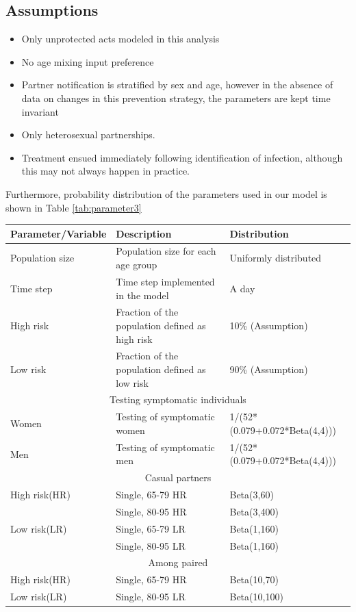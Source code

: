 \documentclass{article}
\begin{document}
\begin{normalsize}
\subsection{Assumptions}
\begin{itemize}
	\item Only unprotected acts modeled in this analysis
	\item No age mixing input preference
	\item Partner notification is stratified by sex and age, however in the absence of data on changes in this prevention strategy, the parameters are kept time invariant
	\item Only heterosexual partnerships.
	\item Treatment ensued immediately following identification of infection, although this may not always happen in practice.
\end{itemize}
Furthermore, probability distribution of the parameters used in our model is shown in Table \ref{tab:parameter3}\\
	\begin{table}[H]
	\centering
	\begin{tabular}{ |p{5cm}|p{7cm}|p{5cm}| } 
		\hline
		Parameter/Variable & Description & Distribution  \\ 
		\hline
		Population size & Population size for each age group & Uniformly distributed\\
		Time step &	Time step implemented in the model & 	A day \\
		High risk & Fraction of the population defined as high risk	& 10\% (Assumption) \\
		Low risk & Fraction of the population defined as low risk & 90\% (Assumption)\\
		\hline
		\multicolumn{3}{|c|}{Testing symptomatic individuals} \\
		\hline
		Women &	Testing of symptomatic  women	& 1/(52*(0.079+0.072*Beta(4,4)))\\
		Men	& Testing of symptomatic men	& 1/(52*(0.079+0.072*Beta(4,4)))\\
		\hline
		
		\multicolumn{3}{|c|}{Casual partners} \\
		\hline
		High risk(HR)& Single, 65-79 HR	& Beta(3,60)\\
		& Single, 80-95 HR	& Beta(3,400)\\
		Low risk(LR)	 & Single, 65-79 LR	& Beta(1,160) \\
		& Single, 80-95 LR	&Beta(1,160)\\
		\hline
		\multicolumn{3}{|c|}{Among paired} \\
		\hline
		High risk(HR)& Single, 65-79 HR	& Beta(10,70)\\
		Low risk(LR) & Single, 80-95 LR	& Beta(10,100)\\
		\hline
		

\end{tabular}
\end{table}
\end{normalsize}
\end{document}
